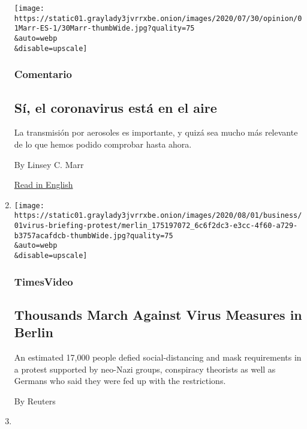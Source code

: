 \begin{enumerate}
  \texttt{[image: https://static01.graylady3jvrrxbe.onion/images/2020/07/30/opinion/01Marr-ES-1/30Marr-thumbWide.jpg?quality=75\\\&auto=webp\\\&disable=upscale]}

  \hypertarget{comentario}{%
  \subsubsection{Comentario}\label{comentario}}

  \hypertarget{suxed-el-coronavirus-estuxe1-en-el-aire}{%
  \subsection{Sí, el coronavirus está en el
  aire}\label{suxed-el-coronavirus-estuxe1-en-el-aire}}

  La transmisión por aerosoles es importante, y quizá sea mucho más
  relevante de lo que hemos podido comprobar hasta ahora.

  By Linsey C. Marr

  \href{https://www.nytimes3xbfgragh.onion/2020/07/30/opinion/coronavirus-aerosols.html}{Read
  in English}
\item
  \href{/video/world/europe/100000007268465/coronavirus-protest-germany.html}{}

  \texttt{[image: https://static01.graylady3jvrrxbe.onion/images/2020/08/01/business/01virus-briefing-protest/merlin\_175197072\_6c6f2dc3-e3cc-4f60-a729-b3757acafdcb-thumbWide.jpg?quality=75\\\&auto=webp\\\&disable=upscale]}

  \hypertarget{timesvideo}{%
  \subsubsection{TimesVideo}\label{timesvideo}}

  \hypertarget{thousands-march-against-virus-measures-in-berlin}{%
  \subsection{Thousands March Against Virus Measures in
  Berlin}\label{thousands-march-against-virus-measures-in-berlin}}

  An estimated 17,000 people defied social-distancing and mask
  requirements in a protest supported by neo-Nazi groups, conspiracy
  theorists as well as Germans who said they were fed up with the
  restrictions.

  By Reuters
\item
  \href{/2020/08/01/us/eid-al-adha-coronavirus.html}{}


\end{enumerate}
